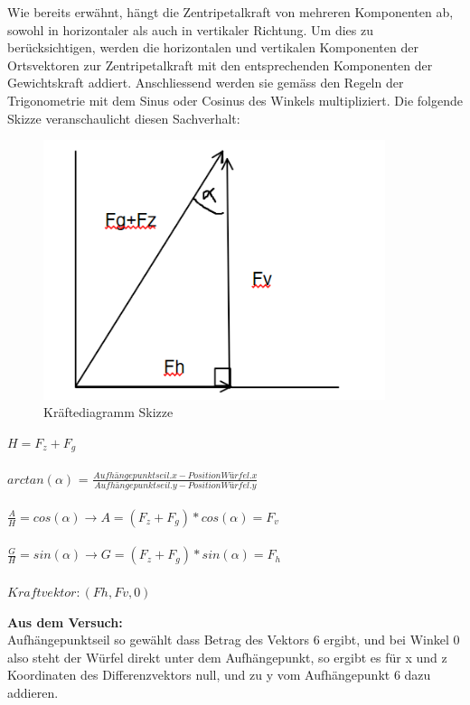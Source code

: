 \documentclass[../main.tex]{subfiles}
\begin{document}
Wie bereits erwähnt, hängt die Zentripetalkraft von mehreren Komponenten ab, sowohl in horizontaler als auch in vertikaler Richtung. Um dies zu berücksichtigen, werden die horizontalen und vertikalen Komponenten der Ortsvektoren zur Zentripetalkraft mit den entsprechenden Komponenten der Gewichtskraft addiert. Anschliessend werden sie gemäss den Regeln der Trigonometrie mit dem Sinus oder Cosinus des Winkels multipliziert. Die folgende Skizze veranschaulicht diesen Sachverhalt:     \begin{figure}[H]
               \begin{center}
                   \centerline{\includegraphics[width=100mm]{./images/Lab3Unity/KraefteDiagramm.png}}
                   \caption{Kräftediagramm Skizze}
                   \label{fig:KräfteDiagramm}
               \end{center}
     \end{figure}
\begin{mdframed}
$H = F_z +F_g$\\\\
$arctan(\alpha)$ = $\frac{Aufhängepunktseil.x-Position Würfel.x }{Aufhängepunktseil.y-Position Würfel.y }$\\\\
$\frac{A}{H}= cos(\alpha) \rightarrow A = (F_z + F_g) * cos(\alpha)= F_v$\\\\
$\frac{G}{H}= sin(\alpha) \rightarrow G = (F_z + F_g) * sin(\alpha)= F_h$\\\\
$Kraftvektor: (Fh,Fv,0)$
\end{mdframed}
\textbf {Aus dem Versuch:\\}
Aufhängepunktseil so gewählt dass Betrag des Vektors 6 ergibt, und bei Winkel 0 also steht der Würfel direkt unter dem Aufhängepunkt, so ergibt es für x und z Koordinaten des Differenzvektors null, und zu y vom Aufhängepunkt 6 dazu addieren.\\
\end{document}
